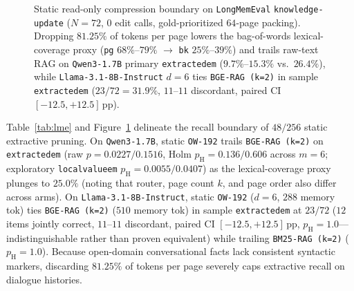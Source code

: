 \documentclass[10pt]{article}
\newcommand{\pp}{\,\text{pp}}
\renewcommand{\_}{\origunderscore\allowbreak}
\begin{document}
\begin{figure}[t]
\centering
{}
\caption{Static read-only compression boundary on \texttt{LongMemEval} \texttt{knowledge-update} ($N=72$, $0$ edit calls, gold-prioritized $64$-page packing). Dropping $81.25\%$ of tokens per page lowers the bag-of-words lexical-coverage proxy (\texttt{pg} $68\%$--$79\%$ $\rightarrow$ \texttt{bk} $25\%$--$39\%$) and trails raw-text RAG on \texttt{Qwen3-1.7B} primary \texttt{extracted\_em} ($9.7\%$--$15.3\%$ vs.\ $26.4\%$), while \texttt{Llama-3.1-8B-Instruct} $d=6$ ties \texttt{BGE-RAG (k=2)} in sample \texttt{extracted\_em} ($23/72 = 31.9\%$, $11$--$11$ discordant, paired CI $[-12.5, +12.5]\pp$).}
\label{fig:lme}
\end{figure}

Table~\ref{tab:lme} and Figure~\ref{fig:lme} delineate the recall boundary of $48/256$ static extractive pruning. On \texttt{Qwen3-1.7B}, static \texttt{OW-192} trails \texttt{BGE-RAG (k=2)} on \texttt{extracted\_em} (raw $p=0.0227 / 0.1516$, Holm $p_{\text{H}}=0.136 / 0.606$ across $m=6$; exploratory \texttt{local\_value\_em} $p_{\text{H}}=0.0055 / 0.0407$) as the lexical-coverage proxy plunges to $25.0\%$ (noting that router, page count $k$, and page order also differ across arms). On \texttt{Llama-3.1-8B-Instruct}, static \texttt{OW-192} ($d=6$, $288$ memory tok) ties \texttt{BGE-RAG (k=2)} ($510$ memory tok) in sample \texttt{extracted\_em} at $23/72$ ($12$ items jointly correct, $11$--$11$ discordant, paired CI $[-12.5, +12.5]\pp$, $p_{\text{H}}=1.0$---indistinguishable rather than proven equivalent) while trailing \texttt{BM25-RAG (k=2)} ($p_{\text{H}}=1.0$). Because open-domain conversational facts lack consistent syntactic markers, discarding $81.25\%$ of tokens per page severely caps extractive recall on dialogue histories.
\end{document}
